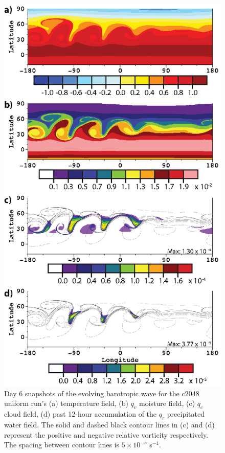 \begin{figure}
   \centerline{%
   \noindent
   \includegraphics[height=.9\textheight]{Chap2/A_c2048_allvar-01}}
   \caption{Day 6 snapshots of the evolving barotropic wave for the c2048 uniform 
   run's (a) temperature field, (b) $q_v$ moisture field, (c) $q_c$ cloud field, (d) past 12-hour 
   accumulation of the $q_r$ precipitated water field. The solid and dashed black contour
   lines in (c) and (d) represent the positive and negative relative vorticity respectively.
   The spacing between contour lines is $5 \times 10^{-5}$ s$^{-1}$.
   }
   \label{fig:c2048allvar}
\end{figure}

